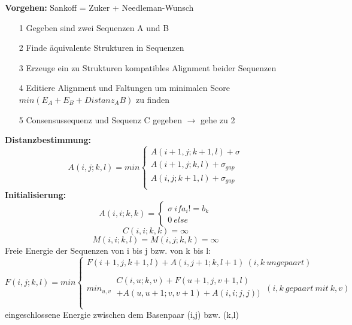 \textbf{Vorgehen:} Sankoff = Zuker + Needleman-Wunsch
\begin{itemize}
\item[1] Gegeben sind zwei Sequenzen A und B
\item[2] Finde äquivalente Strukturen in Sequenzen
\item[3] Erzeuge ein zu Strukturen kompatibles Alignment beider Sequenzen
\item[4] Editiere Alignment und Faltungen um minimalen Score $min(E_A + E_B + Distanz_AB)$ zu finden
\item[5] Consensussequenz und Sequenz C gegeben $\rightarrow$ gehe zu 2
\end{itemize}
\textbf{Distanzbestimmung:}
\begin{equation}
A(i,j;k,l)= min \begin{cases} 
A(i+1,j;k+1,l) + \sigma \\
A(i+1,j;k,l) + \sigma_{gap} \\
A(i,j;k+1,l) + \sigma_{gap} \\
\end{cases}
\end{equation}
\textbf{Initialisierung:}
\begin{equation}
A(i,i;k,k) = \begin{cases} \sigma \ if a_i != b_k \\ 0 \ else\end{cases}
\end{equation}
\begin{equation}
C(i,i;k,k) = \infty
\end{equation}
\begin{equation}
M(i,i;k,l) = M(i,j;k,k) = \infty
\end{equation}
Freie Energie der Sequenzen von i bis j bzw. von k bis l:
\begin{equation}
F(i,j;k,l)= min \begin{cases}
F(i+1,j,k+1,l) + A(i,j+1;k,l+1) \ (i,k \ ungepaart) \\
\\
min_{u,v}\ 
\begin{split}
C(i,u;k,v) + F(u+1,j,v+1,l) \\
+ A(u,u+1;v,v+1) + A(i,i;j,j)) \\ 
\end{split}
\ (i,k \ gepaart \ mit \ k,v)\\
\end{cases}
\end{equation}
eingeschlossene Energie zwischen dem Basenpaar (i,j) bzw. (k,l)
